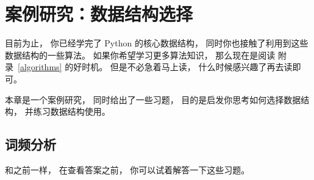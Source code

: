 

\chapter{案例研究：数据结构选择}


目前为止， 你已经学完了 Python 的核心数据结构， 同时你也接触了利用到这些数据结构的一些算法。
如果你希望学习更多算法知识， 那么现在是阅读 附录~\ref{algorithms} 的好时机。
但是不必急着马上读， 什么时候感兴趣了再去读即可。


本章是一个案例研究， 同时给出了一些习题， 目的是启发你思考如何选择数据结构， 并练习数据结构使用。

\section{词频分析}
\label{analysis}


和之前一样， 在查看答案之前， 你可以试着解答一下这些习题。

